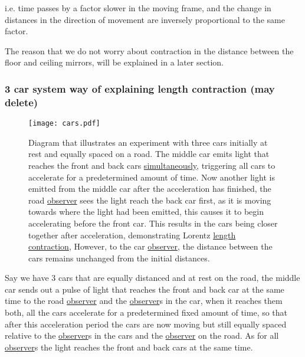 i.e. time passes by a factor slower in the moving frame, and the change in distances in the direction of movement are inversely proportional to the same factor.

The reason that we do not worry about contraction in the distance between the floor and ceiling mirrors, will be explained in a later section.




\subsubsection{3 car system way of explaining length contraction (may delete)}


\begin{figure}[ht]
\centering
       \texttt{[image: cars.pdf]}
    \caption{Diagram that illustrates an experiment with three cars initially at rest and equally spaced on a road. The middle car emits light that reaches the front and back cars \protect\hyperlink{def-simultaneity}{simultaneously}, triggering all cars to accelerate for a predetermined amount of time. Now another light is emitted from the middle car after the acceleration has finished, the road \protect\hyperlink{def-observer}{observer} sees the light reach the back car first, as it is moving towards where the light had been emitted, this causes it to begin accelerating before the front car. This results in the cars being closer together after acceleration, demonstrating Lorentz \protect\hyperlink{def-length-contraction}{length contraction}, However, to the car \protect\hyperlink{def-observer}{observer}, the distance between the cars remains unchanged from the initial distances.}
    \label{fig: cars}
\end{figure}

Say we have 3 cars that are equally distanced and at rest on the road, the middle car sends out a pulse of light that reaches the front and back car at the same time to the road \hyperlink{def-observer}{observer} and the \hyperlink{def-observer}{observer}s in the car, when it reaches them both, all the cars accelerate for a predetermined fixed amount of time, so that after this acceleration period the cars are now moving but still equally spaced relative to the \hyperlink{def-observer}{observer}s in the cars and the \hyperlink{def-observer}{observer} on the road. As for all \hyperlink{def-observer}{observer}s the light reaches the front and back cars at the same time. 

